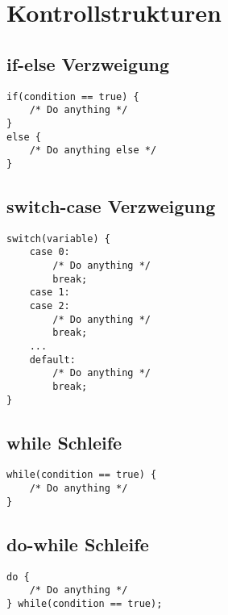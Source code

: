 



\section{Kontrollstrukturen}

\subsection{if-else Verzweigung}
\begin{lstlisting}[caption=if Verzweigung]
if(condition == true) {
    /* Do anything */
}
else {
    /* Do anything else */
}
\end{lstlisting}

\subsection{switch-case Verzweigung}
\begin{lstlisting}[caption=switch-case Verzweigung]
switch(variable) {
    case 0: 
        /* Do anything */
        break;
    case 1: 
    case 2:
        /* Do anything */
        break;
    ...
    default: 
        /* Do anything */
        break;
}
\end{lstlisting}

\subsection{while Schleife}
\begin{lstlisting}[caption=while Schleife]
while(condition == true) {
    /* Do anything */
}
\end{lstlisting}

\subsection{do-while Schleife}
\begin{lstlisting}[caption=do-while]
do {
    /* Do anything */
} while(condition == true);
\end{lstlisting}

